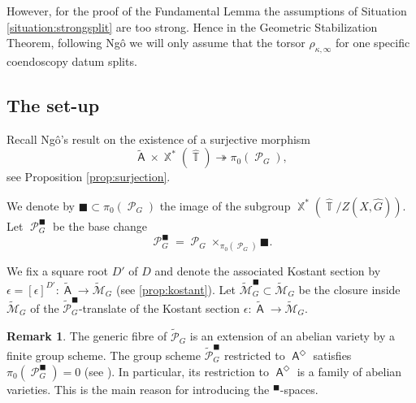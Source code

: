 \documentclass{article}
\DeclareMathOperator{\Hom}{\mathsf{Hom}}
\DeclareMathOperator{\A}{\mathsf{A}}
\DeclareMathOperator{\ani}{ani}
\DeclareMathOperator{\Xb}{\mathbb{X}}
\DeclareMathOperator{\Tb}{\mathbb{T}}
\newcommand{\Mc}{\mathcal{M}}
\DeclareMathOperator{\Pc}{\mathcal{P}}
\DeclareMathOperator{\Spec}{\mathsf{Spec}}
\DeclareMathOperator{\Oo}{\mathcal{O}}
\newcommand{\BM}{{\mathbb{M}}}
\newcommand{\CE}{{\mathcal E}}
\newcommand{\wpc}{\widetilde{\mathcal{P}} }
\newcommand{\wmc}{\widetilde{\Mc} }
\newcommand{\wac}{\widetilde{\A} }
\theoremstyle{definition}
\newtheorem{rmk}[definition]{Remark}
\theoremstyle{plain}
\begin{document}
However, for the proof of the Fundamental Lemma the assumptions of Situation \ref{situation:strongsplit} are too strong. Hence in the Geometric Stabilization Theorem, following Ng\^o we will only assume that the torsor $\rho_{\kappa,\infty}$ for one specific coendoscopy datum splits.
\subsection{The set-up}\label{set-up}
Recall Ng\^o's result on the existence of a surjective morphism 
\begin{equation}\label{ngomap}
  \widetilde{\A} \times \Xb^*(\widehat{\Tb}) \twoheadrightarrow \pi_0(\Pc_G),
\end{equation} 
see Proposition \ref{prop:surjection}. 

We denote by $\blacksquare \subset \pi_0(\Pc_G)$ the image of the subgroup $\Xb^*(\widehat{\Tb}/Z(X,\widehat{G}))$. Let $\Pc_G^{\blacksquare}$ be the base change
$$\Pc_G^{\blacksquare} = \Pc_G \times_{\pi_0(\Pc_G)} \blacksquare.$$

We fix a square root $D'$ of $D$ and denote the associated Kostant section by $\epsilon = [\epsilon]^{D'}: \wac \to \wmc_G$ (see \ref{prop:kostant}). Let $\wmc_G^\blacksquare \subset \wmc_G$ be the closure inside $\widetilde{\Mc}_G$ of the $\wpc_G^{\blacksquare}$-translate of the Kostant section $\epsilon: \wac \to \wmc_G$. 
%

\begin{rmk}
The generic fibre of $\wpc_G$ is an extension of an abelian variety by a finite group scheme. The group scheme $\wpc_{G}^\blacksquare$ restricted to $\A^\Diamond$ satisfies $\pi_0(\Pc_G^{\blacksquare}) = 0$ (see \cite[Corollaire 4.10.4]{MR2653248}). In particular, its restriction to $\A^{\Diamond}$ is a family of abelian varieties. This is the main reason for introducing the ${}^\blacksquare$-spaces.
\end{rmk}
\end{document}
